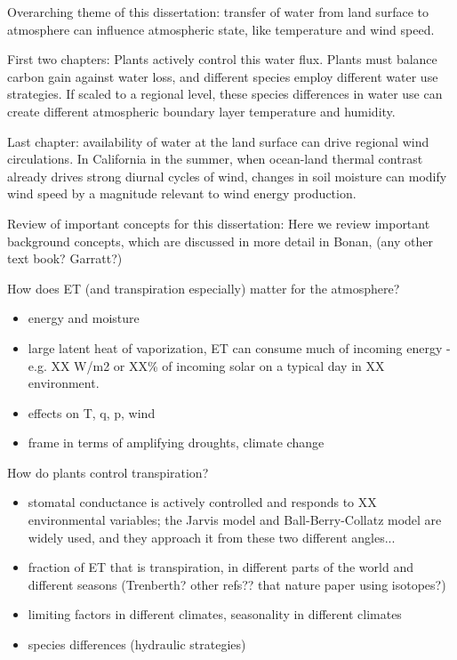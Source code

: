 Overarching theme of this dissertation: transfer of water from land surface to atmosphere can influence atmospheric state, like temperature and wind speed.  

First two chapters: Plants actively control this water flux.  Plants must balance carbon gain against water loss, and different species employ different water use strategies.  If scaled to a regional level, these species differences in water use can create different atmospheric boundary layer temperature and humidity.

Last chapter: availability of water at the land surface can drive regional wind circulations.  In California in the summer, when ocean-land thermal contrast already drives strong diurnal cycles of wind, changes in soil moisture can modify wind speed by a magnitude relevant to wind energy production.

Review of important concepts for this dissertation:  Here we review important background concepts, which are discussed in more detail in Bonan, (any other text book? Garratt?)

How does ET (and transpiration especially) matter for the atmosphere?
\begin{itemize}
\item energy and moisture
\item large latent heat of vaporization, ET can consume much of incoming energy - e.g. XX W/m2 or XX\% of incoming solar on a typical day in XX environment.
\item effects on T, q, p, wind
\item frame in terms of amplifying droughts, climate change
\end{itemize}

How do plants control transpiration?
\begin{itemize}
\item stomatal conductance is actively controlled and responds to XX environmental variables; the Jarvis model and Ball-Berry-Collatz model are widely used, and they approach it from these two different angles...
\item fraction of ET that is transpiration, in different parts of the world and different seasons (Trenberth?  other refs?? that nature paper using isotopes?)
\item limiting factors in different climates, seasonality in different climates
\item species differences (hydraulic strategies)
\end{itemize}

